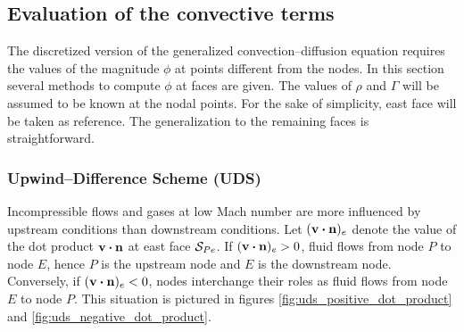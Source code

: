 
\subsection{Evaluation of the convective terms}

The discretized version of the generalized convection--diffusion equation requires the values of the magnitude $\phi$ at points different from the nodes. In this section several methods to compute $\phi$ at faces are given. The values of $\rho$ and $\Gamma$ will be assumed to be known at the nodal points. For the sake of simplicity, east face will be taken as reference. The generalization to the remaining faces is straightforward. 

\subsubsection{Upwind--Difference Scheme (UDS)}

Incompressible flows and gases at low Mach number are more influenced by upstream conditions than downstream conditions. Let $(\vb{v} \vdot \vb{n})_e$ denote the value of the dot product $\vb{v} \vdot \vb{n}$ at east face $\mathcal{S}_{Pe}$. If $(\vb{v} \vdot \vb{n})_e > 0$, fluid flows from node $P$ to node $E$, hence $P$ is the upstream node and $E$ is the downstream node. Conversely, if $(\vb{v} \vdot \vb{n})_e < 0$, nodes interchange their roles as fluid flows from node $E$ to node $P$. This situation is pictured in figures \ref{fig:uds_positive_dot_product} and \ref{fig:uds_negative_dot_product}.

